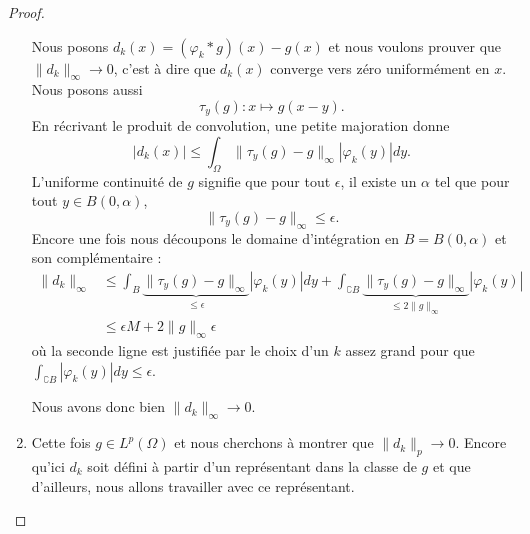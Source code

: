 \begin{proof}
\begin{enumerate}
            Nous posons \( d_k(x)=(\varphi_k*g)(x)-g(x)\) et nous voulons prouver que \( \| d_k \|_{\infty}\to 0\), c'est à dire que \( d_k(x)\) converge vers zéro uniformément en \( x\). Nous posons aussi 
            \begin{equation}
                \tau_y(g)\colon x\mapsto g(x-y).
            \end{equation}
            En récrivant le produit de convolution, une petite majoration donne
            \begin{equation}
                | d_k(x) |\leq \int_{\Omega}\| \tau_y(g)-g \|_{\infty}| \varphi_k(y) |dy.
            \end{equation}
            L'uniforme continuité de \( g\) signifie que pour tout \( \epsilon\), il existe un \( \alpha\) tel que pour tout \( y\in B(0,\alpha)\),
            \begin{equation}
                \| \tau_y(g)-g \|_{\infty}\leq \epsilon.
            \end{equation}
            Encore une fois nous découpons le domaine d'intégration en \( B=B(0,\alpha)\) et son complémentaire :
            \begin{subequations}
                \begin{align}
                    \| d_k \|_{\infty}&\leq\int_B\underbrace{\| \tau_y(g)-g \|_{\infty}}_{\leq \epsilon}| \varphi_k(y) |dy+\int_{\complement B}\underbrace{\| \tau_y(g)-g \|_{\infty}}_{\leq 2\| g \|_{\infty}}| \varphi_k(y) |\\
                    &\leq \epsilon M+2\| g \|_{\infty}\epsilon
                \end{align}
            \end{subequations}
            où la seconde ligne est justifiée par le choix d'un \( k\) assez grand pour que \( \int_{\complement B}| \varphi_k(y) |dy\leq \epsilon\).

            Nous avons donc bien \( \| d_k \|_{\infty}\to 0\).

        \item

            Cette fois \( g\in L^p(\Omega)\) et nous cherchons à montrer que \( \| d_k \|_p\to 0\). Encore qu'ici \( d_k\) soit défini à partir d'un représentant dans la classe de \( g\) et que d'ailleurs, nous allons travailler avec ce représentant.


\end{enumerate}
\end{proof}
